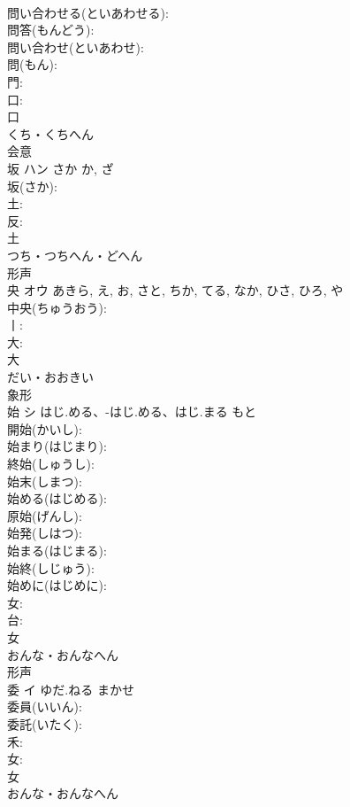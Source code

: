 \documentclass[8pt]{extreport}
\begin{document}
\begin{CJK}{UTF8}{min}
\\	問い合わせる(といあわせる): 
\\	問答(もんどう): 
\\	問い合わせ(といあわせ): 
\\	問(もん): 
\\	門: 
\\	口: 
\\	口	
\\	くち・くちへん	
\\	会意 
\\	坂	ハン	さか	か, ざ	
\\	坂(さか): 
\\	土: 
\\	反: 
\\	土	
\\	つち・つちへん・どへん	
\\	形声 
\\	央	オウ		あきら, え, お, さと, ちか, てる, なか, ひさ, ひろ, や	
\\	中央(ちゅうおう): 
\\	丨: 
\\	大: 
\\	大	
\\	だい・おおきい	
\\	象形 
\\	始	シ	はじ.める、-はじ.める、はじ.まる	もと	
\\	開始(かいし): 
\\	始まり(はじまり): 
\\	終始(しゅうし): 
\\	始末(しまつ): 
\\	始める(はじめる): 
\\	原始(げんし): 
\\	始発(しはつ): 
\\	始まる(はじまる): 
\\	始終(しじゅう): 
\\	始めに(はじめに): 
\\	女: 
\\	台: 
\\	女	
\\	おんな・おんなへん	
\\	形声 
\\	委	イ	ゆだ.ねる	まかせ	
\\	委員(いいん): 
\\	委託(いたく): 
\\	禾: 
\\	女: 
\\	女	
\\	おんな・おんなへん	

\end{CJK}
\end{document}
